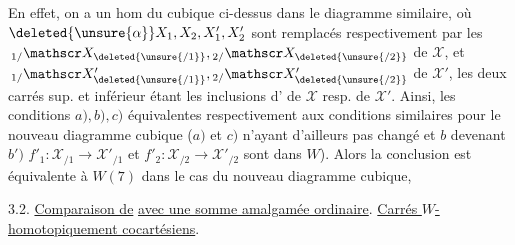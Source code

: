 En effet, on a un hom du   cubique ci-dessus dans le diagramme similaire, où $\deleted{\unsure{\alpha}}X_1,X_2,X'_1,X'_2$ sont remplacés respectivement par les \uline{} $\,{}_{1/}\mathscr X_{\deleted{\unsure{/1}}},{}_{2/}\mathscr X_{\deleted{\unsure{/2}}}$ de $\mathscr X$, et $\,{}_{1/}\mathscr X'_{\deleted{\unsure{/1}}},{}_{2/}\mathscr X'_{\deleted{\unsure{/2}}}$ de $\mathscr X'$, les deux carrés sup. et inférieur étant les inclusions d' de $\mathscr X$ resp. de $\mathscr X'$. Ainsi, les conditions $a),b),c)$  équivalentes respectivement aux conditions similaires pour le nouveau diagramme cubique
($a)$ et $c)$ n'ayant d'ailleurs pas changé et $b$ devenant $b')$ $f'_1:\mathscr X_{/1}\to\mathscr X'_{/1}$ et $f'_2:\mathscr X_{/2}\to\mathscr X'_{/2}$ sont dans $W$). Alors la conclusion  est équivalente à $W(7)$  dans le cas du nouveau diagramme cubique, 

3.2. \uline{Comparaison de}
\uline{avec une somme amalgamée ordinaire}. \uline{Carrés $W$-homotopiquement cocartésiens}.

